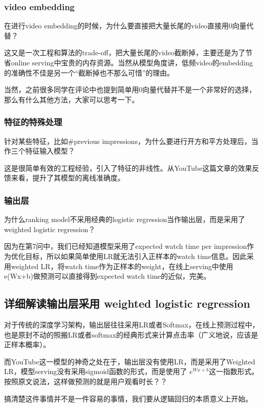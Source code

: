 \documentclass[12pt]{article}
\begin{document}
\subsubsection{video embedding}
在进行video embedding的时候，为什么要直接把大量长尾的video直接用0向量代替？

这又是一次工程和算法的trade-off，把大量长尾的video截断掉，主要还是为了节省online serving中宝贵的内存资源。当然从模型角度讲，低频video的embedding的准确性不佳是另一个“截断掉也不那么可惜”的理由。

当然，之前很多同学在评论中也提到简单用0向量代替并不是一个非常好的选择，那么有什么其他方法，大家可以思考一下。

\subsubsection{特征的特殊处理}
针对某些特征，比如\#previous impressions，为什么要进行开方和平方处理后，当作三个特征输入模型？

这是很简单有效的工程经验，引入了特征的非线性。从YouTube这篇文章的效果反馈来看，提升了其模型的离线准确度。

\subsubsection{输出层}
为什么ranking model不采用经典的logistic regression当作输出层，而是采用了weighted logistic regression？

因为在第7问中，我们已经知道模型采用了expected watch time per impression作为优化目标，所以如果简单使用LR就无法引入正样本的watch time信息。因此采用weighted LR，将watch time作为正样本的weight，在线上serving中使用e(Wx+b)做预测可以直接得到expected watch time的近似，完美。

\subsection{详细解读输出层采用 weighted logistic regression}

对于传统的深度学习架构，输出层往往采用LR或者Softmax，在线上预测过程中，也是原封不动的照搬LR或者softmax的经典形式来计算点击率（广义地说，应该是正样本概率）。

而YouTube这一模型的神奇之处在于，输出层没有使用LR，而是采用了Weighted LR，模型serving没有采用sigmoid函数的形式，而是使用了
$e^{Wx+b}$这一指数形式。按照原文说法，这样做预测的就是用户观看时长？？

搞清楚这件事情并不是一件容易的事情，我们要从逻辑回归的本质意义上开始。
\end{document}
